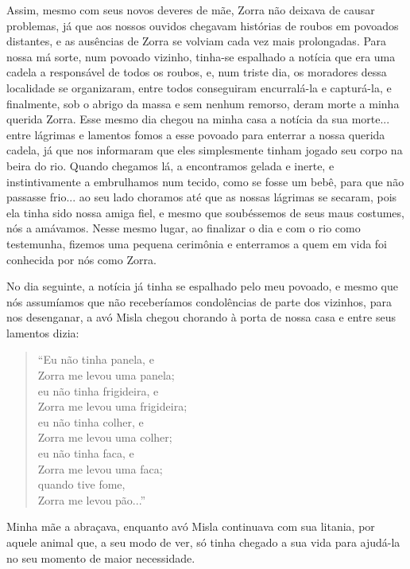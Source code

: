 Assim, mesmo com seus novos deveres de mãe, Zorra não deixava de causar problemas, já que aos nossos ouvidos chegavam histórias de roubos em povoados distantes, e as ausências de Zorra se volviam cada vez mais prolongadas.
Para nossa má sorte, num povoado vizinho, tinha-se espalhado a notícia que era uma cadela a responsável de todos os roubos, e, num triste dia, os moradores dessa localidade se organizaram, entre todos conseguiram encurralá-la e capturá-la, e finalmente, sob o abrigo da massa e sem nenhum remorso, deram morte a minha querida Zorra.
Esse mesmo dia chegou na minha casa a notícia da sua morte... entre lágrimas e lamentos fomos a esse povoado para enterrar a nossa querida cadela, já que nos informaram que eles simplesmente tinham jogado seu corpo na beira do rio. Quando chegamos lá, a encontramos gelada e inerte, e instintivamente a embrulhamos num tecido, como se fosse um bebê, para que não passasse frio... ao seu lado choramos até que as nossas lágrimas se secaram, pois ela tinha sido nossa amiga fiel, e mesmo que soubéssemos de  seus maus costumes, nós a amávamos.
Nesse mesmo lugar, ao finalizar o dia e com o rio como testemunha, fizemos uma pequena cerimônia e enterramos a quem em vida foi conhecida por nós como Zorra. 

No dia seguinte, a notícia já tinha se espalhado pelo meu povoado, e mesmo que nós assumíamos que não receberíamos condolências de parte dos vizinhos, para nos desenganar, a avó Misla chegou chorando à porta de nossa casa e entre seus lamentos dizia:
\begin{quotation}
\noindent ``Eu não tinha panela, e \\Zorra me levou uma panela;\\ 
eu não tinha frigideira, e \\Zorra me levou uma frigideira;\\ 
eu não tinha colher, e \\Zorra me levou uma colher;\\
eu não tinha faca, e \\Zorra me levou uma faca;\\
quando tive fome, \\Zorra me levou pão...''
\end{quotation}
Minha mãe a abraçava, enquanto avó Misla continuava com sua litania, por aquele animal que, a seu modo de ver, só tinha chegado a sua vida para ajudá-la no seu momento de maior necessidade.
 

